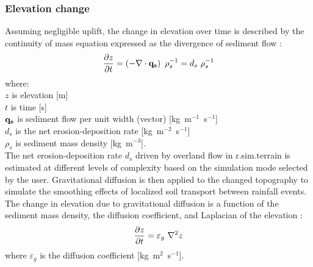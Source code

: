 \documentclass[gmd, manuscript]{copernicus}
\begin{document}
\subsubsection{Elevation change} 
Assuming negligible uplift, the change in elevation over time 
is described by the continuity of mass equation 
expressed as the divergence of sediment flow  \citep{Tucker2001}:
\begin{equation}
\label{eq:evolution} 
{\partial z \over \partial t } = \left (-\nabla \cdot {\bf q_s} \right ) ~ \rho_s^{-1} = d_s ~ \rho_s^{-1} 
\end{equation}
{\small
where: \\
\noindent
\hspace*{0.5em} $z$ is elevation [\unit{m}] \\
\hspace*{0.5em} $t$ is time [\unit{s}] \\
\hspace*{0.5em} ${\bf q_s}$ is sediment flow per unit width (vector) [\unit{kg~m}$^{-1}$~\unit{s}$^{-1}$]\\
\hspace*{0.5em} $d_s$ is the net erosion-deposition rate [\unit{kg~m}$^{-2}$~\unit{s}$^{-1}$]\\
\hspace*{0.5em} $\rho_s$ is sediment mass density [\unit{kg~m}$^{-3}$].\\
}
The net erosion-deposition rate $d_s$ driven by overland flow
in r.sim.terrain is estimated at different levels of complexity based 
on the simulation mode selected by the user.
Gravitational diffusion is then applied to the changed topography 
to simulate the smoothing effects 
of localized soil transport between rainfall events.
The change in elevation due to gravitational diffusion
is a function of the sediment mass density,
the diffusion coefficient, and Laplacian of the elevation
\citep{Thaxton2004}:
\begin{equation}
\label{eq:grav_diffusion} 
{\partial z \over \partial t } =  \varepsilon_g ~ \nabla^2 z 
\end{equation}
\noindent
where $\varepsilon_g$ is the diffusion coefficient [\unit{kg~m}$^{2}$~\unit{s}$^{-1}$].
\end{document}
